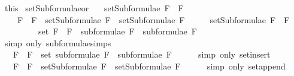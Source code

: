 \begin{isabellebody}
\ this\isanewline
{}\isamarkupfalse%
%
\endisatagproof
{\isafoldproof}%
%
\isadelimproof
\isanewline
%
\endisadelimproof
\isanewline
{}\isamarkupfalse%
\ setSubformulae{\isacharunderscore}or{\isacharcolon}\ \isanewline
\ \ {\isachardoublequoteopen}setSubformulae\ {\isacharparenleft}F{}\ \isactrlbold {\isasymor}\ F{}{\isacharparenright}\ \isanewline
\ \ \ {\isacharequal}\ {\isacharbraceleft}F{}\ \isactrlbold {\isasymor}\ F{}{\isacharbraceright}\ {\isasymunion}\ {\isacharparenleft}setSubformulae\ F{}\ {\isasymunion}\ setSubformulae\ F{}{\isacharparenright}{\isachardoublequoteclose}\isanewline
%
\isadelimproof
%
\endisadelimproof
%
\isatagproof
{}\isamarkupfalse%
\ {\isacharminus}\isanewline
\ \ \isamarkupfalse%
\ {\isachardoublequoteopen}setSubformulae\ {\isacharparenleft}F{}\ \isactrlbold {\isasymor}\ F{}{\isacharparenright}\ \isanewline
\ \ \ \ \ \ \ \ {\isacharequal}\ set\ {\isacharparenleft}{\isacharparenleft}F{}\ \isactrlbold {\isasymor}\ F{}{\isacharparenright}\ {\isacharhash}\ {\isacharparenleft}subformulae\ F{}\ {\isacharat}\ subformulae\ F{}{\isacharparenright}{\isacharparenright}{\isachardoublequoteclose}\isanewline
\ \ \ \ \isamarkupfalse%
\ {\isacharparenleft}simp\ only{\isacharcolon}\ subformulae{\isachardot}simps{\isacharparenleft}{}{\isacharparenright}{\isacharparenright}\isanewline
\ \ \isamarkupfalse%
\ \isamarkupfalse%
\ {\isachardoublequoteopen}{\isasymdots}\ {\isacharequal}\ {\isacharbraceleft}F{}\ \isactrlbold {\isasymor}\ F{}{\isacharbraceright}\ {\isasymunion}\ {\isacharparenleft}set\ {\isacharparenleft}subformulae\ F{}\ {\isacharat}\ subformulae\ F{}{\isacharparenright}{\isacharparenright}{\isachardoublequoteclose}\isanewline
\ \ \ \ \isamarkupfalse%
\ {\isacharparenleft}simp\ only{\isacharcolon}\ set{\isacharunderscore}insert{\isacharparenright}\isanewline
\ \ \isamarkupfalse%
\ \isamarkupfalse%
\ {\isachardoublequoteopen}{\isasymdots}\ {\isacharequal}\ {\isacharbraceleft}F{}\ \isactrlbold {\isasymor}\ F{}{\isacharbraceright}\ {\isasymunion}\ {\isacharparenleft}setSubformulae\ F{}\ {\isasymunion}\ setSubformulae\ F{}{\isacharparenright}{\isachardoublequoteclose}\isanewline
\ \ \ \ \isamarkupfalse%
\ {\isacharparenleft}simp\ only{\isacharcolon}\ set{\isacharunderscore}append{\isacharparenright}\isanewline

\end{isabellebody}
